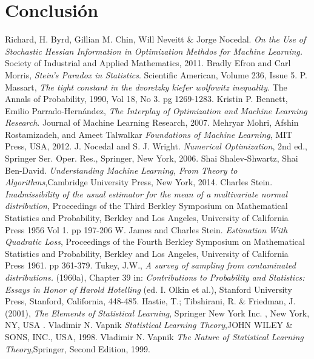 \documentclass{book}
\theoremstyle{plain}
\theoremstyle{definition}
\theoremstyle{remark}
\begin{document}
\chapter{Conclusión}


\begin{thebibliography}{9}
 Richard, H. Byrd, Gillian M. Chin, Will Neveitt \& Jorge Nocedal.
  \emph{On the Use of Stochastic Hessian Information in Optimization Methdos for Machine Learning.} Society of Industrial and Applied Mathematics, 2011.
 Bradly Efron and Carl Morris, \emph{Stein's Paradox in Statistics}. Scientific American, Volume 236, Issue 5.
 P. Massart, \emph{The tight constant in the dvoretzky kiefer wolfowitz inequality}. The Annals of Probability, 1990, Vol 18, No 3. pg 1269-1283. 
 Kristin P. Bennett, Emilio Parrado-Hernández, \emph{The Interplay of Optimization and Machine Learning Research}. Journal of Machine Learning Research, 2007.
 Mehryar Mohri, Afshin Rostamizadeh, and Ameet Talwalkar
  \emph{Foundations of Machine Learning}, MIT Press, USA, 2012.
 J. Nocedal and S. J. Wright. \emph{Numerical Optimization}, 2nd ed., Springer Ser. Oper. Res., Springer, New York, 2006.
 Shai Shalev-Shwartz, Shai Ben-David. \emph{Understanding Machine Learning, From Theory to Algorithms},Cambridge University Press, New York, 2014.
 Charles Stein. \emph{Inadmissibility of the usual estimator for the mean of a multivariate normal distribution}, Proceedings of the Third Berkley Symposium on Mathematical Statistics and Probability, Berkley and Los Angeles, University of California Press 1956 Vol 1. pp 197-206
 W. James and Charles Stein. \emph{Estimation With Quadratic Loss},  Proceedings of the Fourth Berkley Symposium on Mathematical Statistics and Probability, Berkley and Los Angeles, University of California Press 1961. pp 361-379.
 Tukey, J.W., \emph{A survey of sampling from contaminated distributions.} (1960a), Chapter 39 in: \emph{Contributions to Probability and Statistics: Essays in Honor of Harold Hotelling} (ed. I. Olkin et al.), Stanford University Press, Stanford, California, 448-485.
 Hastie, T.; Tibshirani, R. \& Friedman, J. (2001), \emph{The Elements of Statistical Learning}, Springer New York Inc. , New York, NY, USA .
 Vladimir N. Vapnik  \emph{Statistical Learning Theory},JOHN WILEY \& SONS, INC., USA, 1998.
 Vladimir N. Vapnik  \emph{The Nature of Statistical Learning Theory},Springer, Second Edition, 1999.

\end{thebibliography}
\end{document}
